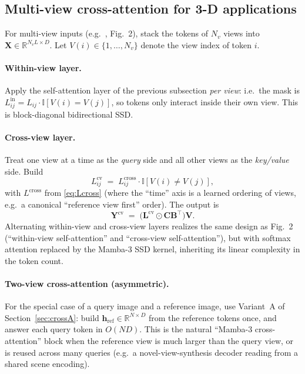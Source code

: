 \documentclass[11pt,a4paper]{article}
\begin{document}
\subsection{Multi-view cross-attention for 3-D applications}
\label{sec:multiview}

For multi-view inputs (e.g.\ \cite{depthanything3}, Fig.~2),
stack the tokens of $N_v$ views into
$\bm{X}\in\mathbb{R}^{N_v L \times D}$. Let $V(i)\in\{1,\dots,N_v\}$
denote the view index of token $i$.

\paragraph{Within-view layer.} Apply the self-attention layer of the
previous subsection \emph{per view}: i.e.\ the mask is
$L_{ij}^{\text{in}} = L_{ij}\cdot\mathbb{I}[V(i)=V(j)]$, so tokens
only interact inside their own view. This is block-diagonal
bidirectional SSD.

\paragraph{Cross-view layer.} Treat one view at a time as the
\emph{query} side and all other views as the \emph{key/value} side.
Build
\begin{equation}\label{eq:Lxview}
  L_{ij}^{\text{cv}}
    \;=\; L^{\text{cross}}_{ij}\cdot \mathbb{I}[V(i)\neq V(j)],
\end{equation}
with $L^{\text{cross}}$ from \eqref{eq:Lcross} (where the ``time'' axis
is a learned ordering of views, e.g.\ a canonical ``reference view
first'' order). The output is
\begin{equation}\label{eq:cvout}
  \bm{Y}^{\text{cv}} \;=\; \bigl(\bm{L}^{\text{cv}}\odot\bm{C}\bm{B}^\top\bigr)\bm{V}.
\end{equation}
Alternating within-view and cross-view layers realizes the same
design as \cite{depthanything3} Fig.~2 (``within-view
self-attention'' and ``cross-view self-attention''), but with softmax
attention replaced by the Mamba-3 SSD kernel, inheriting its linear
complexity in the token count.

\paragraph{Two-view cross-attention (asymmetric).} For the special
case of a query image and a reference image, use Variant~A of
Section~\ref{sec:crossA}: build
$\bm{h}_{\text{ref}}\in\mathbb{R}^{N\times D}$ from the reference
tokens once, and answer each query token in $O(ND)$. This is the
natural ``Mamba-3 cross-attention'' block when the reference view is
much larger than the query view, or is reused across many queries
(e.g.\ a novel-view-synthesis decoder reading from a shared scene
encoding).
\end{document}
